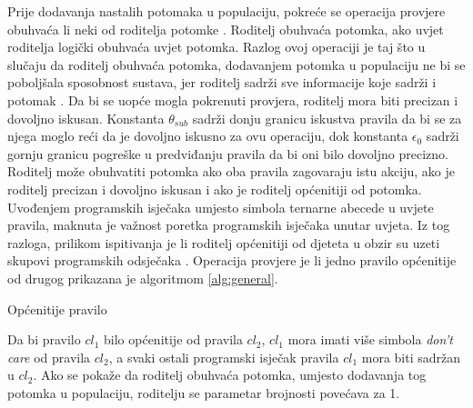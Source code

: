 \documentclass[times, utf8, zavrsni]{fer}
\begin{document}
Prije dodavanja nastalih potomaka u populaciju, pokreće se operacija provjere obuhvaća li neki od roditelja potomke .
Roditelj obuhvaća potomka, ako uvjet roditelja logički obuhvaća uvjet potomka.
Razlog ovoj operaciji je taj što u slučaju da roditelj obuhvaća potomka, dodavanjem potomka u populaciju ne bi se poboljšala sposobnost sustava, jer roditelj sadrži sve informacije koje sadrži i potomak \citep{1}.
Da bi se uopće mogla pokrenuti provjera, roditelj mora biti precizan i dovoljno iskusan.
Konstanta $\theta_{sub}$ sadrži donju granicu iskustva pravila da bi se za njega moglo reći da je dovoljno iskusno za ovu operaciju, dok konstanta $\epsilon_{0}$ sadrži gornju granicu pogreške u predviđanju pravila da bi oni bilo dovoljno precizno.
Roditelj može obuhvatiti potomka ako oba pravila zagovaraju istu akciju, ako je roditelj precizan i dovoljno iskusan i ako je roditelj općenitiji od potomka.
Uvođenjem programskih isječaka umjesto simbola ternarne abecede u uvjete pravila, maknuta je važnost poretka programskih isječaka unutar uvjeta.
Iz tog razloga, prilikom ispitivanja je li roditelj općenitiji od djeteta u obzir su uzeti skupovi programskih odsječaka \citep{4}.
Operacija provjere je li jedno pravilo općenitije od drugog prikazana je algoritmom \ref{alg:general}.
\begin{algorithm}
    \caption{Općenitije pravilo}
    \label{alg:general}
    \begin{algorithmic}
        \ENDIF
        \ENDIF
    \end{algorithmic}
\end{algorithm}
Da bi pravilo $cl_{1}$ bilo općenitije od pravila $cl_{2}$, $cl_{1}$ mora imati više simbola \emph{don't care} od pravila $cl_{2}$, a svaki ostali programski isječak pravila $cl_{1}$ mora biti sadržan u $cl_{2}$.
Ako se pokaže da roditelj obuhvaća potomka, umjesto dodavanja tog potomka u populaciju, roditelju se parametar brojnosti povećava za 1.
\end{document}
